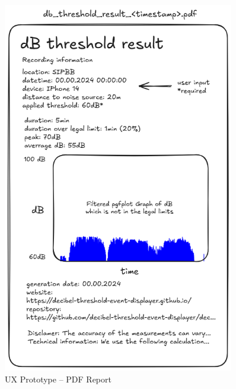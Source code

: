 \begin{figure}[H]
    \centering
    \includegraphics[width=0.9\textwidth]{../assets/ux_prototype.png}
    \caption{UX Prototype – PDF Report}\label{fig:ux_prototype_pdf_report}
\end{figure}

